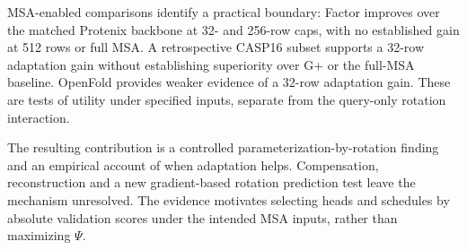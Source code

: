 MSA-enabled comparisons identify a practical boundary: Factor improves
over the matched Protenix backbone at 32- and 256-row caps, with no
established gain at 512 rows or full MSA. A retrospective CASP16 subset
supports a 32-row adaptation gain without establishing superiority over G+
or the full-MSA baseline. OpenFold provides weaker evidence of a 32-row
adaptation gain.
These are tests of utility under specified inputs, separate from the
query-only rotation interaction.

The resulting contribution is a controlled parameterization-by-rotation
finding and an empirical account of when adaptation helps. Compensation,
reconstruction and a new gradient-based rotation prediction test leave
the mechanism unresolved. The evidence motivates selecting heads and
schedules by absolute validation scores under the intended MSA inputs,
rather than maximizing $\Psi$.

